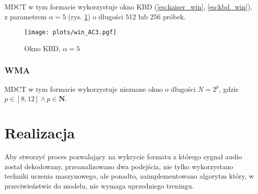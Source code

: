 \documentclass[pl,12pt]{aghdpl}
\let\Oldchapter\chapter%
\renewcommand{\chapter}{\FloatBarrier\Oldchapter}
\let\Oldsubsection\subsection%
\renewcommand{\subsection}{\FloatBarrier\Oldsubsection}
\begin{document}
MDCT w tym formacie wykorzystuje okno KBD (\ref{eq:kaiser_win},
\ref{eq:kbd_win}), z parametrem $\alpha = 5$ (rys. \ref{fig:win_AC3}) o
długości 512 lub 256 próbek.
\begin{figure}[!tbh]
  \centering
  \texttt{[image: plots/win\_AC3.pgf]}
  \caption{Okno KBD, $\alpha = 5$}
  \label{fig:win_AC3}
\end{figure}

\subsection{WMA}

MDCT w tym formacie wykorzystuje nieznane okno o długości $N = 2^p$, gdzie $p
\in [8,12] \land p \in\bm N$.

\chapter{Realizacja}
Aby stworzyć proces pozwalający na wykrycie formatu z którego sygnał audio
został dekodowany, przeanalizowano dwa podejścia, nie tylko wykorzystano
techniki uczenia maszynowego, ale ponadto, zaimplementowano algorytm który, w
przeciwieństwie do modelu, nie wymaga uprzedniego treningu.
\end{document}
